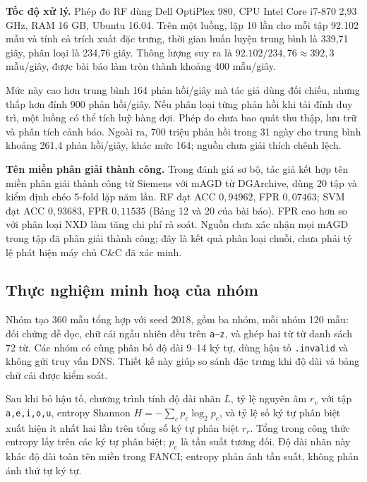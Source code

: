 \textbf{Tốc độ xử lý.} Phép đo RF dùng Dell OptiPlex 980, CPU Intel Core i7-870 2,93 GHz, RAM 16 GB, Ubuntu 16.04. Trên một luồng, lặp 10 lần cho mỗi tập 92.102 mẫu và tính cả trích xuất đặc trưng, thời gian huấn luyện trung bình là 339,71 giây, phân loại là 234,76 giây. Thông lượng suy ra là $92.102/234{,}76\approx392{,}3$ mẫu/giây, được bài báo làm tròn thành khoảng 400 mẫu/giây.

Mức này cao hơn trung bình 164 phản hồi/giây mà tác giả dùng đối chiếu, nhưng thấp hơn đỉnh 900 phản hồi/giây. Nếu phân loại từng phản hồi khi tải đỉnh duy trì, một luồng có thể tích luỹ hàng đợi. Phép đo chưa bao quát thu thập, lưu trữ và phân tích cảnh báo. Ngoài ra, 700 triệu phản hồi trong 31 ngày cho trung bình khoảng 261,4 phản hồi/giây, khác mức 164; nguồn chưa giải thích chênh lệch.

\textbf{Tên miền phân giải thành công.}\label{sec:phan-giai-thanh-cong} Trong đánh giá sơ bộ, tác giả kết hợp tên miền phân giải thành công từ Siemens với mAGD từ DGArchive, dùng 20 tập và kiểm định chéo 5-fold lặp năm lần. RF đạt ACC $0{,}94962$, FPR $0{,}07463$; SVM đạt ACC $0{,}93683$, FPR $0{,}11535$ (Bảng 12 và 20 của bài báo). FPR cao hơn so với phân loại NXD làm tăng chi phí rà soát. Nguồn chưa xác nhận mọi mAGD trong tập đã phân giải thành công; đây là kết quả phân loại chuỗi, chưa phải tỷ lệ phát hiện máy chủ C\&C đã xác minh.

\subsection{Thực nghiệm minh hoạ của nhóm}\label{sec:thuc-nghiem-nhom}

Nhóm tạo 360 mẫu tổng hợp với seed 2018, gồm ba nhóm, mỗi nhóm 120 mẫu: đối chứng dễ đọc, chữ cái ngẫu nhiên đều trên \texttt{a--z}, và ghép hai từ từ danh sách 72 từ. Các nhóm có cùng phân bố độ dài 9--14 ký tự, dùng hậu tố \texttt{.invalid} và không gửi truy vấn DNS. Thiết kế này giúp so sánh đặc trưng khi độ dài và bảng chữ cái được kiểm soát.

Sau khi bỏ hậu tố, chương trình tính độ dài nhãn $L$, tỷ lệ nguyên âm $r_v$ với tập \texttt{a,e,i,o,u}, entropy Shannon $H=-\sum_c p_c\log_2p_c$, và tỷ lệ số ký tự phân biệt xuất hiện ít nhất hai lần trên tổng số ký tự phân biệt $r_r$. Tổng trong công thức entropy lấy trên các ký tự phân biệt; $p_c$ là tần suất tương đối. Độ dài nhãn này khác độ dài toàn tên miền trong FANCI; entropy phản ánh tần suất, không phản ánh thứ tự ký tự.

\begin{table}[H]
\centering
\caption{Đặc trưng trên dữ liệu tổng hợp: trung bình $\pm$ độ lệch chuẩn tổng thể.}
\label{tab:c4-minh-hoa}

\end{table}

